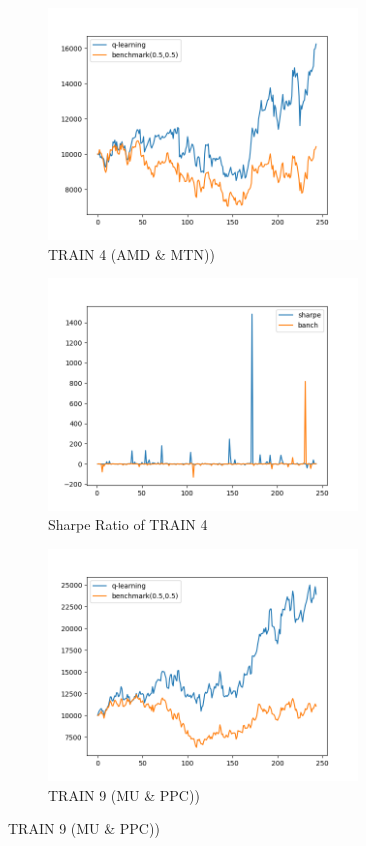 \newpage
\begin{figure}[H]
\begin{subfigure}{.5\textwidth}%
\centering
\includegraphics[clip, width=0.9\textwidth]{Graphics/trainPA33.png} \caption{TRAIN 4 (AMD \& MTN))} 
\end{subfigure}%
\begin{subfigure}{.5\textwidth}%
\centering
\includegraphics[clip, width=0.9\textwidth]{Graphics/trainPA33S.png} \caption{Sharpe Ratio of TRAIN 4}
\end{subfigure}%
\vspace{0.1cm}
\begin{subfigure}{.5\textwidth}%
\centering
\includegraphics[clip, width=0.9\textwidth]{Graphics/trainPA99.png} \caption{TRAIN 9 (MU \& PPC))} 

\end{subfigure}
\end{figure}
